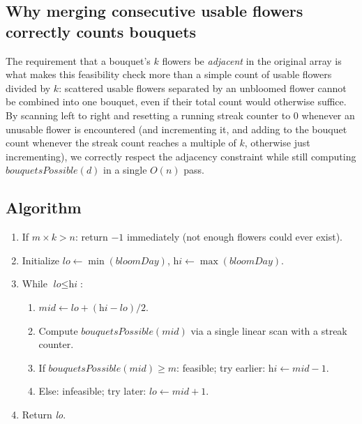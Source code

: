 \subsection*{Why merging consecutive usable flowers correctly counts bouquets}

The requirement that a bouquet's $k$ flowers be \emph{adjacent} in the
original array is what makes this feasibility check more than a simple
count of usable flowers divided by $k$: scattered usable flowers separated
by an unbloomed flower cannot be combined into one bouquet, even if their
total count would otherwise suffice. By scanning left to right and
resetting a running streak counter to $0$ whenever an unusable flower is
encountered (and incrementing it, and adding to the bouquet count
whenever the streak count reaches a multiple of $k$, otherwise just
incrementing), we correctly respect the adjacency constraint while still
computing $\textit{bouquetsPossible}(d)$ in a single $O(n)$ pass.

\subsection*{Algorithm}

\begin{enumerate}
  \item If $m \times k > n$: return $-1$ immediately (not enough flowers
        could ever exist).
  \item Initialize $\textit{lo} \gets \min(\textit{bloomDay})$,
        $\textit{hi} \gets \max(\textit{bloomDay})$.
  \item While $\textit{lo} \le \textit{hi}$:
  \begin{enumerate}
    \item $\textit{mid} \gets \textit{lo}+(\textit{hi}-\textit{lo})/2$.
    \item Compute $\textit{bouquetsPossible}(\textit{mid})$ via a single
          linear scan with a streak counter.
    \item If $\textit{bouquetsPossible}(\textit{mid}) \ge m$: feasible;
          try earlier: $\textit{hi} \gets \textit{mid}-1$.
    \item Else: infeasible; try later: $\textit{lo} \gets \textit{mid}+1$.
  \end{enumerate}
  \item Return \textit{lo}.
\end{enumerate}

